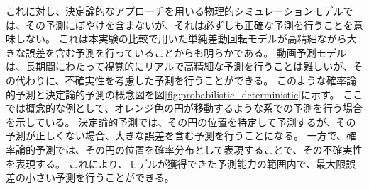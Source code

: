       これに対し、決定論的なアプローチを用いる物理的シミュレーションモデルでは、その予測にぼやけを含まないが、それは必ずしも正確な予測を行うことを意味しない。
      これは本実験の比較で用いた単純差動回転モデルが高精細ながら大きな誤差を含む予測を行っていることからも明らかである。
      動画予測モデルは、長期間にわたって視覚的にリアルで高精細な予測を行うことは難しいが、その代わりに、不確実性を考慮した予測を行うことができる。
      このような確率論的予測と決定論的予測の概念図を図\ref{fig:probabilistic_deterministic}に示す。
      ここでは概念的な例として、オレンジ色の円が移動するような系での予測を行う場合を示している。
      決定論的予測では、その円の位置を特定して予測するが、その予測が正しくない場合、大きな誤差を含む予測を行うことになる。
      一方で、確率論的予測では、その円の位置を確率分布として表現することで、その不確実性を表現する。
      これにより、モデルが獲得できた予測能力の範囲内で、最大限誤差の小さい予測を行うことができる。
